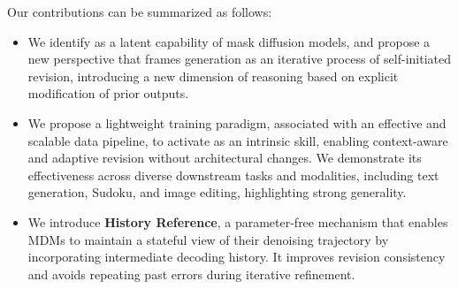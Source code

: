 Our contributions can be summarized as follows:
\begin{itemize}[leftmargin=*]
    \item We identify \textbf{\methodfull} as a latent capability of mask diffusion models, and propose a new perspective that frames generation as an iterative process of self-initiated revision, introducing a new dimension of reasoning based on explicit modification of prior outputs.

    \item We propose a lightweight training paradigm, associated with an effective and scalable data pipeline, to activate \methodfull as an intrinsic skill, enabling context-aware and adaptive revision without architectural changes. We demonstrate its effectiveness across diverse downstream tasks and modalities, including text generation, Sudoku, and image editing, highlighting strong generality.

    \item We introduce \textbf{History Reference}, a parameter-free mechanism that enables MDMs to maintain a stateful view of their denoising trajectory by incorporating intermediate decoding history. It improves revision consistency and avoids repeating past errors during iterative refinement.
\end{itemize}